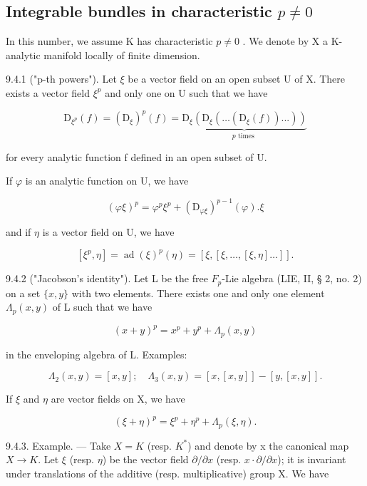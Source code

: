\subsection{\texorpdfstring{Integrable bundles in characteristic \(p \neq 0\)}{Integrable bundles in characteristic p nonzero}}

In this number, we assume K has characteristic \(p \neq 0\) . We denote by X a K-analytic manifold locally of finite dimension.

9.4.1 ("p-th powers"). Let \(\xi\) be a vector field on an open subset U of X. There exists a vector field \(\xi^p\) and only one on U such that we have

\[
\mathrm{D} _ {\xi^ {p}} (f) = (\mathrm{D} _ {\xi}) ^ {p} (f) = \underbrace {\mathrm{D} _ {\xi} (\mathrm{D} _ {\xi} (\dots (\mathrm{D} _ {\xi} (f)) . . .))} _ {p \text { times }}\tag{1}
\]

for every analytic function f defined in an open subset of U.

If \(\varphi\) is an analytic function on U, we have

\[
(\varphi \xi) ^ {p} = \varphi^ {p} \xi^ {p} + (\mathrm{D} _ {\varphi \xi}) ^ {p - 1} (\varphi). \xi\tag{2}
\]

and if \(\eta\) is a vector field on U, we have

\[
[ \xi^ {p}, \eta ] = \operatorname{ad}(\xi) ^ {p} (\eta) = [ \xi , [ \xi , \dots , [ \xi , \eta ] \dots ] ].\tag{3}
\]

9.4.2 ("Jacobson's identity"). Let L be the free \(F_{p}\)-Lie algebra (LIE, II, § 2, no. 2) on a set \(\{x, y\}\) with two elements. There exists one and only one element \(\Lambda_{p}(x, y)\) of L such that we have

\[
(x + y) ^ {p} = x ^ {p} + y ^ {p} + \Lambda_ {p} (x, y)\tag{4}
\]

in the enveloping algebra of L. Examples:

\[
\Lambda_ {2} (x, y) = [ x, y ]; \quad \Lambda_ {3} (x, y) = [ x, [ x, y ] ] - [ y, [ x, y ] ].
\]

If \(\xi\) and \(\eta\) are vector fields on X, we have

\[
(\xi + \eta) ^ {p} = \xi^ {p} + \eta^ {p} + \Lambda_ {p} (\xi , \eta).\tag{5}
\]

9.4.3. Example. --- Take \(X = K\) (resp. \(K^*\)) and denote by x the canonical map \(X \to K\). Let \(\xi\) (resp. \(\eta\)) be the vector field \(\partial/\partial x\) (resp. \(x\cdot\partial/\partial x\)); it is invariant under translations of the additive (resp. multiplicative) group X. We have

